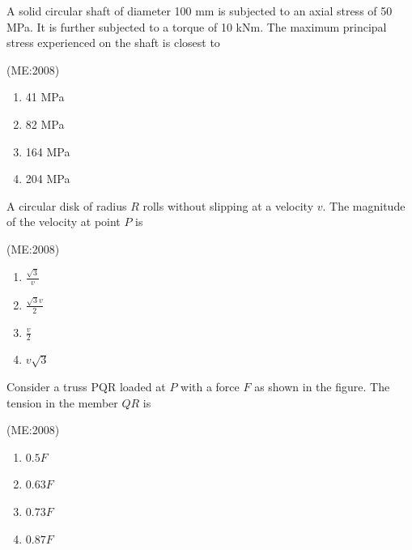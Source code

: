     \item A solid circular shaft of diameter 100 mm is subjected to an axial stress of 50 MPa. It is further subjected to a torque of 10 kNm. The maximum principal stress experienced on the shaft is closest to

	     \hfill{(ME:2008)}

    \begin{multicols}{4}
        \begin{enumerate}
            \item 41 MPa
            \item 82 MPa
            \item 164 MPa
            \item 204 MPa
        \end{enumerate}
    \end{multicols}

    \item A circular disk of radius $R$ rolls without slipping at a velocity $v$. The magnitude of the velocity at point $P$ is\\
	    \begin{center}
	    
	    \end{center}

	     \hfill{(ME:2008)}

       \begin{multicols}{4}
        \begin{enumerate}
            \item $\frac{\sqrt{3}}{v}$
            \item $\frac{\sqrt{3} v}{2}$
            \item $\frac{v}{2}$
            \item $v \sqrt{3}$
        \end{enumerate}
    \end{multicols}

    \item Consider a truss PQR loaded at $P$ with a force $F$ as shown in the figure. The tension in the member $QR$ is\\
	    \begin{center}
	    
	    \end{center}

	     \hfill{(ME:2008)}

       \begin{multicols}{4}
        \begin{enumerate}
            \item $0.5F$
            \item $0.63F$
            \item $0.73F$
            \item $0.87F$
        \end{enumerate}
    \end{multicols}



